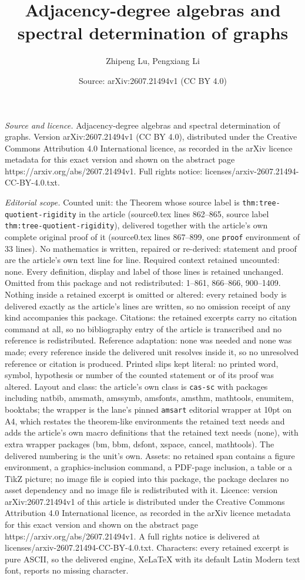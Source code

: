 \documentclass[10pt,a4paper]{amsart}
\title[Adjacency-degree algebras and spectral determination of grap]{Adjacency-degree algebras and spectral determination of graphs}
\author{Zhipeng Lu, Pengxiang Li}
\date{Source: arXiv:2607.21494v1 (CC BY 4.0)}
\begin{document}
\maketitle

\noindent\emph{Source and licence.} Adjacency-degree algebras and spectral determination of graphs. Version arXiv:2607.21494v1 (CC BY 4.0), distributed under the Creative Commons Attribution 4.0 International licence, as recorded in the arXiv licence metadata for this exact version and shown on the abstract page https://arxiv.org/abs/2607.21494v1. Full rights notice: licenses/arxiv-2607.21494-CC-BY-4.0.txt.\par\smallskip

\noindent\textit{Editorial scope.} Counted unit: the Theorem whose source label is \texttt{thm:tree-quotient-rigidity} in the article (source0.tex lines 862--865, source label \texttt{thm:tree-quotient-rigidity}), delivered together with the article's own complete original proof of it (source0.tex lines 867--899, one \texttt{proof} environment of 33 lines). No mathematics is written, repaired or re-derived: statement and proof are the article's own text line for line. Required context retained uncounted: none. Every definition, display and label of those lines is retained unchanged. Omitted from this package and not redistributed: 1--861, 866--866, 900--1409. Nothing inside a retained excerpt is omitted or altered: every retained body is delivered exactly as the article's lines are written, so no omission receipt of any kind accompanies this package. Citations: the retained excerpts carry no citation command at all, so no bibliography entry of the article is transcribed and no reference is redistributed. Reference adaptation: none was needed and none was made; every reference inside the delivered unit resolves inside it, so no unresolved reference or citation is produced. Printed slips kept literal: no printed word, symbol, hypothesis or number of the counted statement or of its proof was altered. Layout and class: the article's own class is \texttt{cas-sc} with packages including natbib, amsmath, amssymb, amsfonts, amsthm, mathtools, enumitem, booktabs; the wrapper is the lane's pinned \texttt{amsart} editorial wrapper at 10pt on A4, which restates the theorem-like environments the retained text needs and adds the article's own macro definitions that the retained text needs (none), with extra wrapper packages (bm, bbm, dsfont, xspace, cancel, mathtools). The delivered numbering is the unit's own. Assets: no retained span contains a figure environment, a graphics-inclusion command, a PDF-page inclusion, a table or a TikZ picture; no image file is copied into this package, the package declares no asset dependency and no image file is redistributed with it. Licence: version arXiv:2607.21494v1 of this article is distributed under the Creative Commons Attribution 4.0 International licence, as recorded in the arXiv licence metadata for this exact version and shown on the abstract page https://arxiv.org/abs/2607.21494v1. A full rights notice is delivered at licenses/arxiv-2607.21494-CC-BY-4.0.txt. Characters: every retained excerpt is pure ASCII, so the delivered engine, XeLaTeX with its default Latin Modern text font, reports no missing character.
\end{document}
